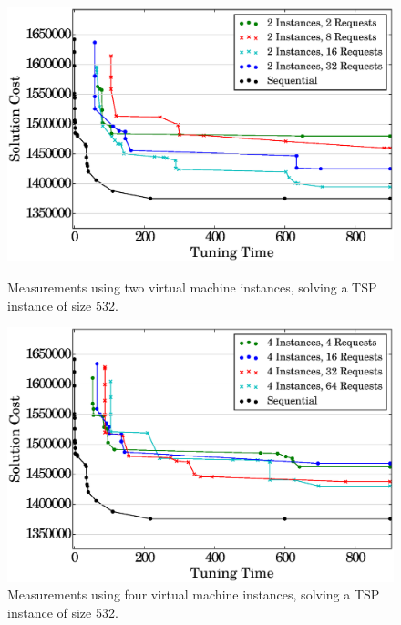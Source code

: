 \documentclass[a4paper, 12pt]{article}
\begin{document}

\begin{figure}[htpb]
    \centering
    \begin{minipage}{.5\textwidth}
        \centering
        \includegraphics[scale=.36]{i2_p_n_comparison}
        \caption{Measurements using two virtual machine instances, solving
                 a TSP instance of size 532.}
        \label{fig:high-level}
    \end{minipage}%
    \hfill
    \begin{minipage}{.5\textwidth}
        \centering
        \includegraphics[scale=.36]{i4_p_n_comparison}
        \caption{Measurements using four virtual machine instances,
                 solving a TSP instance of size 532.}
        \label{fig:low-level}
    \end{minipage}%
    \label{fig:archs}
\end{figure}
\end{document}
